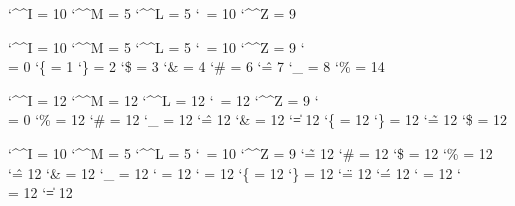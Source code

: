 

\ifdefined\nilcatcodes \else \newcatcodetable \nilcatcodes  \fi
\ifdefined\texcatcodes \else \newcatcodetable \texcatcodes  \fi
\ifdefined\luacatcodes \else \newcatcodetable \luacatcodes  \fi
\ifdefined\notcatcodes \else \newcatcodetable \notcatcodes  \fi
\ifdefined\vrbcatcodes \else \newcatcodetable \vrbcatcodes  \fi
\ifdefined\prtcatcodes \else \newcatcodetable \prtcatcodes  \fi

\startcatcodetable \nilcatcodes
    \catcode`\^^I = 10 %
    \catcode`\^^M =  5 %
    \catcode`\^^L =  5 %
    \catcode`\    = 10 %
    \catcode`\^^Z =  9 %
\stopcatcodetable

\startcatcodetable \texcatcodes
    \catcode`\^^I = 10
    \catcode`\^^M =  5
    \catcode`\^^L =  5
    \catcode`\    = 10
    \catcode`\^^Z =  9
    \catcode`\\   =  0
    \catcode`\{   =  1
    \catcode`\}   =  2
    \catcode`\$   =  3
    \catcode`\&   =  4
    \catcode`\#   =  6
    \catcode`\^   =  7
    \catcode`\_   =  8
    \catcode`\%   = 14
\stopcatcodetable

\startcatcodetable \luacatcodes
    \catcode`\^^I = 12 %
    \catcode`\^^M = 12 %
    \catcode`\^^L = 12 %
    \catcode`\    = 12 %
    \catcode`\^^Z =  9 %
    \catcode`\\   =  0
    \catcode`\%   = 12
    \catcode`\#   = 12
    \catcode`\_   = 12
    \catcode`\^   = 12
    \catcode`\&   = 12
    \catcode`\|   = 12
    \catcode`\{   = 12
    \catcode`\}   = 12
    \catcode`\~   = 12
    \catcode`\$   = 12
\stopcatcodetable

\startcatcodetable \notcatcodes
    \catcode`\^^I = 10 %
    \catcode`\^^M =  5 %
    \catcode`\^^L =  5 %
    \catcode`\    = 10 %
    \catcode`\^^Z =  9 %
    \catcode`\~   = 12
    \catcode`\#   = 12 %
    \catcode`\$   = 12 %
    \catcode`\%   = 12
    \catcode`\^   = 12
    \catcode`\&   = 12
    \catcode`\_   = 12
    \catcode`\<   = 12
    \catcode`\>   = 12
    \catcode`\{   = 12
    \catcode`\}   = 12
    \catcode`\"   = 12
    \catcode`\'   = 12
    \catcode`\/   = 12
    \catcode`\\   = 12
    \catcode`\|   = 12
\stopcatcodetable

